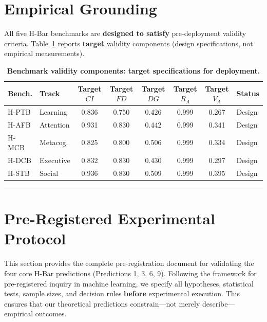 \documentclass[11pt,a4paper]{article}
\begin{document}
\section{Empirical Grounding}\label{sec:empirical}

All five H-Bar benchmarks are \textbf{designed to satisfy} pre-deployment
validity criteria. Table~\ref{tab:validity} reports \textbf{target} validity
components (design specifications, not empirical measurements).

\begin{table}[htbp]
\centering
\caption{\textbf{Benchmark validity components: target specifications for deployment.}}
\label{tab:validity}
\small
\begin{tabular}{l l c c c c c l}
\toprule
\textbf{Bench.} & \textbf{Track} & \textbf{Target $CI$} & \textbf{Target $FD$} & \textbf{Target $DG$} & \textbf{Target $R_A$} & \textbf{Target $V_A$} & \textbf{Status} \\
\midrule
H-PTB & Learning & 0.836 & 0.750 & 0.426 & 0.999 & 0.267 & Design \\
H-AFB & Attention & 0.931 & 0.830 & 0.442 & 0.999 & 0.341 & Design \\
H-MCB & Metacog. & 0.825 & 0.800 & 0.506 & 0.999 & 0.334 & Design \\
H-DCB & Executive & 0.832 & 0.830 & 0.430 & 0.999 & 0.297 & Design \\
H-STB & Social & 0.936 & 0.830 & 0.509 & 0.999 & 0.395 & Design \\
\bottomrule
\end{tabular}
\end{table}

\noindent\rule{\linewidth}{0.4pt}

\section{Pre-Registered Experimental Protocol}\label{sec:empirical-validation}

This section provides the complete pre-registration document for
validating the four core H-Bar predictions (Predictions 1, 3, 6, 9).
Following the framework for pre-registered inquiry in machine learning,
we specify all hypotheses, statistical tests, sample sizes, and decision
rules \textbf{before} experimental execution. This ensures that our
theoretical predictions constrain---not merely describe---empirical
outcomes.
\end{document}
